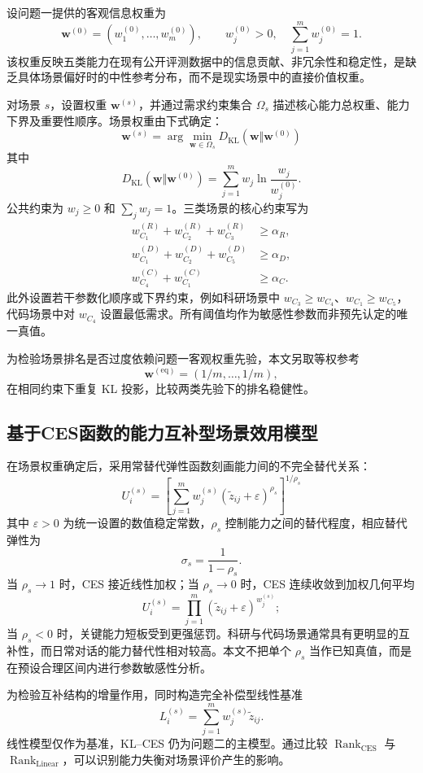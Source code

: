 设问题一提供的客观信息权重为
\[
\boldsymbol w^{(0)}=(w_1^{(0)},\ldots,w_m^{(0)}),
\qquad w_j^{(0)}>0,\quad \sum_{j=1}^{m}w_j^{(0)}=1.
\]
该权重反映五类能力在现有公开评测数据中的信息贡献、非冗余性和稳定性，是缺乏具体场景偏好时的中性参考分布，而不是现实场景中的直接价值权重。

对场景 $s$，设置权重 $\boldsymbol w^{(s)}$，并通过需求约束集合 $\Omega_s$ 描述核心能力总权重、能力下界及重要性顺序。场景权重由下式确定：
\[
\boxed{
\boldsymbol w^{(s)}=
\arg\min_{\boldsymbol w\in\Omega_s}
D_{\mathrm{KL}}\!\left(\boldsymbol w\Vert\boldsymbol w^{(0)}\right)
}
\]
其中
\[
D_{\mathrm{KL}}\!\left(\boldsymbol w\Vert\boldsymbol w^{(0)}\right)
=\sum_{j=1}^{m}w_j\ln\frac{w_j}{w_j^{(0)}}.
\]
公共约束为 $w_j\ge 0$ 和 $\sum_jw_j=1$。三类场景的核心约束写为
\begin{align*}
w_{C_1}^{(R)}+w_{C_2}^{(R)}+w_{C_3}^{(R)}&\ge\alpha_R,\\
w_{C_1}^{(D)}+w_{C_2}^{(D)}+w_{C_5}^{(D)}&\ge\alpha_D,\\
w_{C_4}^{(C)}+w_{C_1}^{(C)}&\ge\alpha_C.
\end{align*}
此外设置若干参数化顺序或下界约束，例如科研场景中 $w_{C_3}\ge w_{C_4}$、$w_{C_1}\ge w_{C_5}$，代码场景中对 $w_{C_4}$ 设置最低需求。所有阈值均作为敏感性参数而非预先认定的唯一真值。

为检验场景排名是否过度依赖问题一客观权重先验，本文另取等权参考
\[
\boldsymbol w^{(\mathrm{eq})}=(1/m,\ldots,1/m),
\]
在相同约束下重复 KL 投影，比较两类先验下的排名稳健性。

\subsection{基于CES函数的能力互补型场景效用模型}

在场景权重确定后，采用常替代弹性函数刻画能力间的不完全替代关系：
\[
\boxed{
U_i^{(s)}=
\left[
\sum_{j=1}^{m}w_j^{(s)}
(\widetilde z_{ij}+\varepsilon)^{\rho_s}
\right]^{1/\rho_s}
}
\]
其中 $\varepsilon>0$ 为统一设置的数值稳定常数，$\rho_s$ 控制能力之间的替代程度，相应替代弹性为
\[
\sigma_s=\frac{1}{1-\rho_s}.
\]
当 $\rho_s\rightarrow1$ 时，CES 接近线性加权；当 $\rho_s\rightarrow0$ 时，CES 连续收敛到加权几何平均
\[
U_i^{(s)}=\prod_{j=1}^{m}(\widetilde z_{ij}+\varepsilon)^{w_j^{(s)}};
\]
当 $\rho_s<0$ 时，关键能力短板受到更强惩罚。科研与代码场景通常具有更明显的互补性，而日常对话的能力替代性相对较高。本文不把单个 $\rho_s$ 当作已知真值，而是在预设合理区间内进行参数敏感性分析。

为检验互补结构的增量作用，同时构造完全补偿型线性基准
\[
L_i^{(s)}=\sum_{j=1}^{m}w_j^{(s)}\widetilde z_{ij}.
\]
线性模型仅作为基准，KL--CES 仍为问题二的主模型。通过比较 $\operatorname{Rank}_{\mathrm{CES}}$ 与 $\operatorname{Rank}_{\mathrm{Linear}}$，可以识别能力失衡对场景评价产生的影响。

